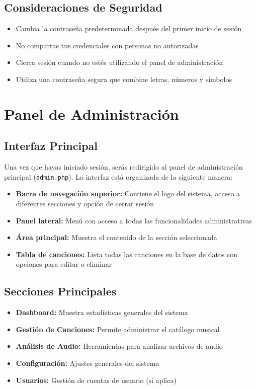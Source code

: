 \documentclass[a4paper,12pt]{article}
\begin{document}
\subsection{Consideraciones de Seguridad}
\begin{itemize}
  \item Cambia la contraseña predeterminada después del primer inicio de sesión
  \item No compartas tus credenciales con personas no autorizadas
  \item Cierra sesión cuando no estés utilizando el panel de administración
  \item Utiliza una contraseña segura que combine letras, números y símbolos
\end{itemize}

\section{Panel de Administración}
\subsection{Interfaz Principal}
Una vez que hayas iniciado sesión, serás redirigido al panel de administración principal (\texttt{admin.php}). La interfaz está organizada de la siguiente manera:
\begin{itemize}
  \item \textbf{Barra de navegación superior:} Contiene el logo del sistema, acceso a diferentes secciones y opción de cerrar sesión
  \item \textbf{Panel lateral:} Menú con acceso a todas las funcionalidades administrativas
  \item \textbf{Área principal:} Muestra el contenido de la sección seleccionada
  \item \textbf{Tabla de canciones:} Lista todas las canciones en la base de datos con opciones para editar o eliminar
\end{itemize}

\subsection{Secciones Principales}
\begin{itemize}
  \item \textbf{Dashboard:} Muestra estadísticas generales del sistema
  \item \textbf{Gestión de Canciones:} Permite administrar el catálogo musical
  \item \textbf{Análisis de Audio:} Herramientas para analizar archivos de audio
  \item \textbf{Configuración:} Ajustes generales del sistema
  \item \textbf{Usuarios:} Gestión de cuentas de usuario (si aplica)
\end{itemize}
\end{document}
